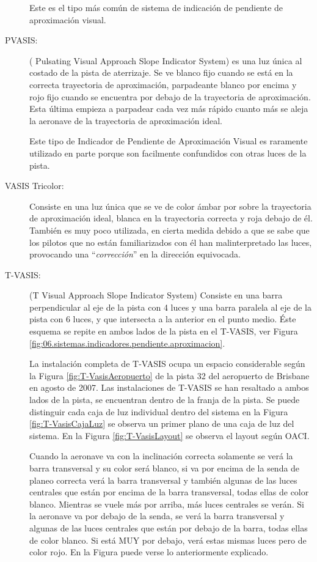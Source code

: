 \begin{description}
Este es el tipo más común de sistema de indicación de pendiente
de aproximación visual.

\item[PVASIS:] ( Pulsating Visual Approach Slope Indicator System) es una
luz única al costado de la pista de aterrizaje. Se ve blanco fijo cuando se está en la correcta
trayectoria de aproximación, parpadeante blanco por encima y rojo fijo cuando se encuentra
por debajo de la trayectoria de aproximación. Esta última empieza a parpadear cada vez más
rápido cuanto más se aleja la aeronave de la trayectoria de aproximación ideal.

Este tipo de
Indicador de Pendiente de Aproximación Visual es raramente utilizado en parte porque son
facilmente confundidos con otras luces de la pista.

\item[VASIS Tricolor:] Consiste en una luz única que se ve de color ámbar por sobre la trayectoria
de aproximación ideal, blanca en la trayectoria correcta y roja debajo de él. También es muy
poco utilizada, en cierta medida debido a que se sabe que los pilotos que no están familiarizados
con él han malinterpretado las luces, provocando una ``\emph{corrección}'' en la dirección equivocada.

\item[T-VASIS:] (T Visual Approach Slope Indicator System) 
  Consiste en una barra perpendicular al eje de la pista
con 4 luces y una barra paralela al eje de la pista con 6 luces, y que intersecta a la anterior en
el punto medio. Éste esquema se repite en ambos lados de la pista en el T-VASIS,
ver Figura \ref{fig:06.sistemas.indicadores.pendiente.aproximacion}.

La instalación completa de T-VASIS ocupa un espacio considerable según la Figura \ref{fig:T-VasisAeropuerto} 
de la pista 32 del aeropuerto de Brisbane en agosto de 2007.
Las instalaciones de T-VASIS se han resaltado a ambos lados de la pista, se encuentran dentro de la franja de la pista.
Se puede distinguir cada caja de luz individual dentro del sistema
en la Figura \ref{fig:T-VasisCajaLuz} 
se observa un primer plano de una caja de luz del sistema. En la Figura \ref{fig:T-VasisLayout}
se observa el layout según OACI.

Cuando la aeronave va con la inclinación correcta solamente se
verá la barra transversal y su color será blanco, si va por encima de la senda de planeo correcta
verá la barra transversal y también algunas de las luces centrales que están por encima de la
barra transversal, todas ellas de color blanco. Mientras se vuele más por arriba, más luces
centrales se verán.
Si la aeronave va por debajo de la senda, se verá la barra transversal y algunas de las luces
centrales que están por debajo de la barra, todas ellas de color blanco. Si está MUY por debajo,
verá estas mismas luces pero de color rojo. En la Figura 
puede verse lo anteriormente explicado.


\end{description}
